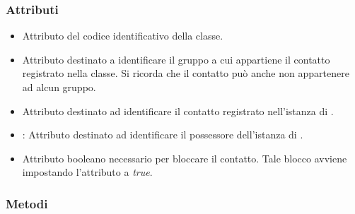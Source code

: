 \subsubsection*{Attributi}

\begin{itemize}
	\item{}
	Attributo del codice identificativo della classe.
	\item{}
	Attributo destinato a identificare il gruppo a cui appartiene il contatto  registrato nella classe. Si ricorda che il contatto può anche non appartenere ad alcun gruppo.
	\item{}
	Attributo destinato ad identificare il contatto registrato nell'istanza di .
	\item{}:
	Attributo destinato ad identificare il possessore dell'istanza di .
	\item{}
	Attributo booleano necessario per bloccare il contatto. Tale blocco avviene impostando l'attributo a \textit{true}.
\end{itemize}


\subsubsection*{Metodi}

